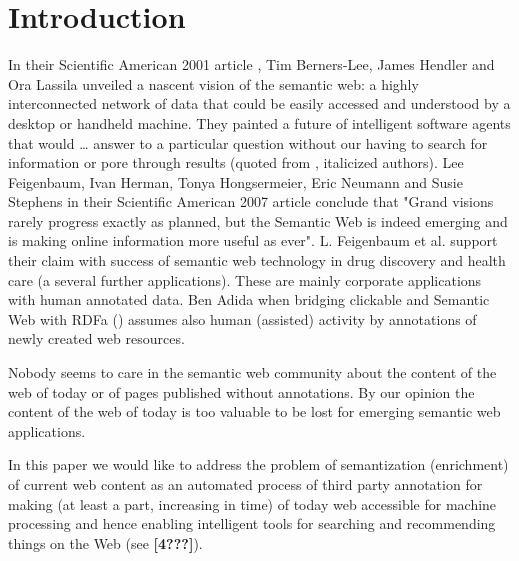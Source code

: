 \documentclass{sig-alternate}
\begin{document}



\section{Introduction}
In their Scientific American 2001 article \cite{biblio:2001-Berners-Lee-SemanticWeb}, Tim Berners-Lee, James Hendler and Ora Lassila unveiled a nascent vision of the semantic web: a highly interconnected network of data that could be easily accessed and understood by a desktop or handheld machine. They painted a future of intelligent software agents that would {\dots} answer to a particular question without our having to search for information or pore through results (quoted from \cite{biblio:feigenbaum_semantic_2007}, italicized authors). Lee Feigenbaum, Ivan Herman, Tonya Hongsermeier, Eric Neumann and Susie Stephens in their Scientific American 2007 article \cite{biblio:feigenbaum_semantic_2007} conclude that "Grand visions rarely progress exactly as planned, but the Semantic Web is indeed emerging and is making online information more useful as ever". L. Feigenbaum et al. support their claim with success of semantic web technology in drug discovery and health care (a several further applications). These are mainly corporate applications with human annotated data.  Ben Adida when bridging clickable and Semantic Web with RDFa (\cite{biblio:AdidaClickable}) assumes also human (assisted) activity by annotations of newly created web resources. 

Nobody seems to care in the semantic web community about the content of the web of today or of pages published without annotations. By our opinion the content of the web of today is too valuable to be lost for emerging semantic web applications. 

In this paper we would like to address the problem of semantization (enrichment) of current web content as an automated process of third party annotation for making (at least a part, increasing in time) of today web accessible for machine processing and hence enabling intelligent tools for searching and recommending things on the Web (see \textbf{[4???]}). 
\end{document}
